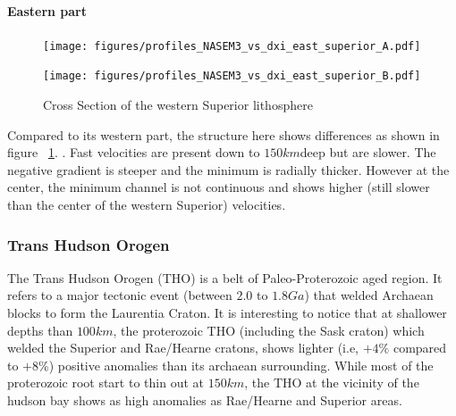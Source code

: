 \documentclass[12pt]{article}
\begin{document}
		\paragraph{Eastern part}
		\begin{figure}[h]
			\begin{minipage}{0.5\linewidth}
				\centerline{\texttt{[image: figures/profiles\_NASEM3\_vs\_dxi\_east\_superior\_A.pdf]}}
			\end{minipage}
			\hfill
			\begin{minipage}{0.5\linewidth}
				\centerline{\texttt{[image: figures/profiles\_NASEM3\_vs\_dxi\_east\_superior\_B.pdf]}}
			\end{minipage}

			\caption{Cross Section of the western Superior lithosphere}
			\label{eastsupcross}

		\end{figure}

		Compared to its western part, the structure here shows differences as shown in figure ~\ref{eastsupcross}. . 
		Fast velocities are present down to $150km$deep but are slower. 
		The negative gradient is steeper and the minimum is radially thicker. 
		However at the center, the minimum channel is not continuous and shows higher (still slower than the center of the western Superior) velocities.

\subsubsection{Trans Hudson Orogen}
	The Trans Hudson Orogen (THO) is a belt of Paleo-Proterozoic aged region. It refers to a major tectonic event (between $2.0$ to $1.8Ga$) that welded Archaean blocks to form the Laurentia Craton.
	It is interesting to notice that at shallower depths than $100km$, the proterozoic THO (including the Sask craton) which welded the Superior and Rae/Hearne cratons, shows lighter (i.e, $+4\%$ compared to $+8\%$) positive anomalies than its archaean surrounding. While most of the proterozoic root start to thin out at $150km$, the THO at the vicinity of the hudson bay shows as high anomalies as Rae/Hearne and Superior areas. 
\end{document}
